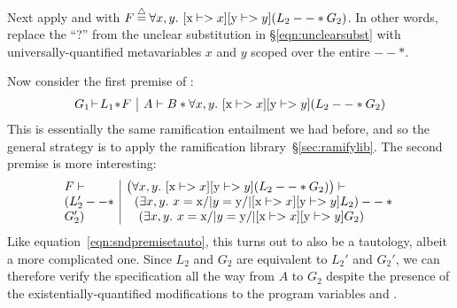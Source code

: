 {%
Next apply  and  with
$F \mathbin{\stackrel{\triangle}{=}} \forall x, y.~ [\text{x} |-> x][\text{y} |-> y](L_2 --* G_2)$.
In other words, replace the ``?'' from the unclear substitution in
\S\ref{eqn:unclearsubst} with universally-quantified metavariables $x$ and $y$ scoped over the entire $--*$.

Now consider the first premise of :
\[
\begin{array}{@{}l|l@{}}
G_1 \! |- \! L_1 \! * \! F & A |- B * \forall x, y.~ [\tx{x} |-> x][\tx{y} |-> y](L_2 --* G_2)
\end{array}
\]
This is essentially the same ramification entailment we had before, and so the general strategy is to apply the ramification library~\S\ref{sec:ramifylib}.  The second premise is more interesting:
\[
\begin{array}{@{}l|l@{}}
F |- & \big(\forall x, y.~ [\tx{x} |-> x][\tx{y} |-> y](L_2 --* G_2) \big) |- \null \\
(L_2' --* & ~~ (\exists x,y.~ x = \tx{x} /| y = \tx{y} /| [\tx{x} |-> x][\tx{y} |-> y] L_2) --* \null \\
G_2') & \quad (\exists x,y. ~ x = \tx{x} /| y = \tx{y} /| [\tx{x} |-> x][\tx{y} |-> y] G_2)
\end{array}
\]
Like equation~\eqref{eqn:sndpremisetauto}, this turns out to also be a tautology, albeit a more complicated one.
Since $L_2$ and $G_2$ are equivalent to $L_2'$ and $G_2'$, we can therefore verify the specification all the way from $A$ to $G_2$ despite the presence of the existentially-quantified modifications to the program variables  and .

}
